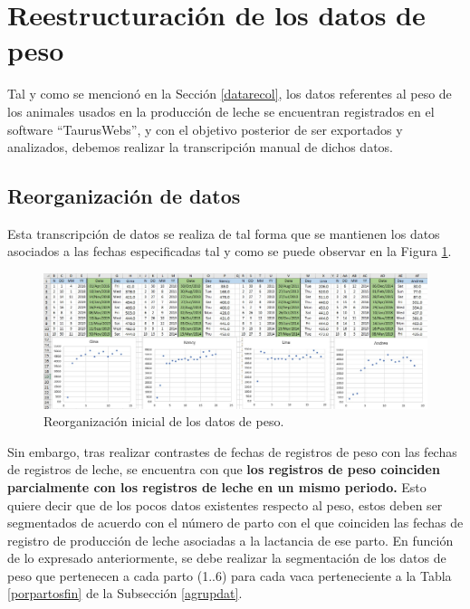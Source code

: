 \section{Reestructuración de los datos de peso}\label{reestructpeso}

Tal y como se mencionó en la Sección \ref{datarecol}, los datos referentes al peso de los animales usados en la producción de leche se encuentran registrados en el software ``TaurusWebs'', y con el objetivo posterior de ser exportados y analizados, debemos realizar la transcripción manual de dichos datos.

\subsection{Reorganización de datos}\label{pocospesos}
Esta transcripción de datos se realiza de tal forma que se mantienen los datos asociados a las fechas especificadas tal y como se puede observar en la Figura \ref{dfpesopng}.
\begin{figure}[H]
	 \begin{center}
	 \includegraphics[scale=0.5]{img/dfinicialpeso.jpg}
	 \end{center}
	 \caption{Reorganización inicial de los datos de peso.  \label{dfpesopng}}
\end{figure}

Sin embargo, tras realizar contrastes de fechas de registros de peso con las fechas de registros de leche, se encuentra con que \textbf{los registros de peso coinciden parcialmente con los registros de leche en un mismo periodo.} Esto quiere decir que de los pocos datos existentes respecto al peso, estos deben ser segmentados de acuerdo con el número de parto con el que coinciden las fechas de registro de producción de leche asociadas a la lactancia de ese parto. En función de lo expresado anteriormente, se debe realizar la segmentación de los datos de peso que pertenecen a cada parto (1..6) para cada vaca perteneciente a la Tabla \ref{porpartosfin} de la Subsección \ref{agrupdat}.\\


